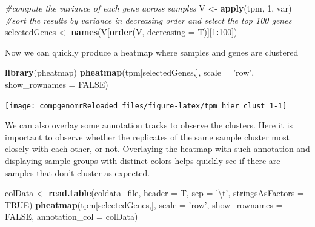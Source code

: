 \documentclass[12pt,]{krantz}
\newenvironment{Shaded}{\begin{snugshade}}{\end{snugshade}}
\newcommand{\CharTok}[1]{\textcolor[rgb]{0.31,0.60,0.02}{#1}}
\newcommand{\CommentTok}[1]{\textcolor[rgb]{0.56,0.35,0.01}{\textit{#1}}}
\newcommand{\DataTypeTok}[1]{\textcolor[rgb]{0.13,0.29,0.53}{#1}}
\newcommand{\DecValTok}[1]{\textcolor[rgb]{0.00,0.00,0.81}{#1}}
\newcommand{\KeywordTok}[1]{\textcolor[rgb]{0.13,0.29,0.53}{\textbf{#1}}}
\newcommand{\NormalTok}[1]{#1}
\newcommand{\OperatorTok}[1]{\textcolor[rgb]{0.81,0.36,0.00}{\textbf{#1}}}
\newcommand{\OtherTok}[1]{\textcolor[rgb]{0.56,0.35,0.01}{#1}}
\newcommand{\StringTok}[1]{\textcolor[rgb]{0.31,0.60,0.02}{#1}}
\begin{document}
\begin{Shaded}
\begin{Highlighting}[]
\CommentTok{#compute the variance of each gene across samples}
\NormalTok{V <-}\StringTok{ }\KeywordTok{apply}\NormalTok{(tpm, }\DecValTok{1}\NormalTok{, var)}
\CommentTok{#sort the results by variance in decreasing order and select the top 100 genes }
\NormalTok{selectedGenes <-}\StringTok{ }\KeywordTok{names}\NormalTok{(V[}\KeywordTok{order}\NormalTok{(V, }\DataTypeTok{decreasing =}\NormalTok{ T)][}\DecValTok{1}\OperatorTok{:}\DecValTok{100}\NormalTok{])}
\end{Highlighting}
\end{Shaded}

Now we can quickly produce a heatmap where samples and genes are clustered

\begin{Shaded}
\begin{Highlighting}[]
\KeywordTok{library}\NormalTok{(pheatmap)}
\KeywordTok{pheatmap}\NormalTok{(tpm[selectedGenes,], }\DataTypeTok{scale =} \StringTok{'row'}\NormalTok{, }\DataTypeTok{show_rownames =} \OtherTok{FALSE}\NormalTok{)}
\end{Highlighting}
\end{Shaded}

\begin{center}\texttt{[image: compgenomrReloaded\_files/figure-latex/tpm\_hier\_clust\_1-1]} \end{center}

We can also overlay some annotation tracks to observe the clusters.
Here it is important to observe whether the replicates of the same sample cluster most closely with each other, or not. Overlaying the heatmap with such annotation and displaying sample groups with distinct colors helps quickly see if there are samples that don't cluster as expected.

\begin{Shaded}
\begin{Highlighting}[]
\NormalTok{colData <-}\StringTok{ }\KeywordTok{read.table}\NormalTok{(coldata_file, }\DataTypeTok{header =}\NormalTok{ T, }\DataTypeTok{sep =} \StringTok{'}\CharTok{\textbackslash{}t}\StringTok{'}\NormalTok{, }\DataTypeTok{stringsAsFactors =} \OtherTok{TRUE}\NormalTok{)}
\KeywordTok{pheatmap}\NormalTok{(tpm[selectedGenes,], }\DataTypeTok{scale =} \StringTok{'row'}\NormalTok{, }
         \DataTypeTok{show_rownames =} \OtherTok{FALSE}\NormalTok{, }
         \DataTypeTok{annotation_col =}\NormalTok{ colData)}
\end{Highlighting}
\end{Shaded}
\end{document}
